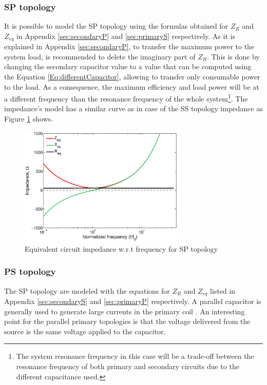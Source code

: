\subsubsection{SP topology}

It is possible to model the SP topology using the formulas obtained for $Z_R$ and $Z_{eq}$ in Appendix \ref{sec:secondaryP} and \ref{sec:primaryS} respectively. As it is explained in Appendix \ref{sec:secondaryP}, to transfer the maximum power to the system load, is recommended to delete the imaginary part of $Z_R$. This is done by changing the secondary capacitor value to a value that can be computed using the Equation \ref{Eq:differentCapacitor}, allowing to transfer only consumable power to the load. As a consequence, the maximum efficiency and load power will be at a different frequency than the resonance frequency of the whole system\footnote{The system resonance frequency in this case will be a trade-off between the resonance frequency of both primary and secondary circuits due to the different capacitance used.}. The impedance's model has a similar curve as in case of the SS topology impedance as Figure \ref{F:SPimpedance} shows.

\begin{figure}[h!]
\begin{center}
\includegraphics[width=0.7\textwidth]{./images/SP_impedance} 
\caption{Equivalent circuit impedance w.r.t frequency for SP topology}
\label{F:SPimpedance}
\end{center}
\end{figure}

\subsubsection{PS topology}

The SP topology are modeled with the equations for $Z_R$ and $Z_{eq}$ listed in Appendix \ref{sec:secondaryS} and \ref{sec:primaryP} respectively. A parallel capacitor is generally used to generate large currents in the primary coil \cite{meyer}. An interesting point for the parallel primary topologies is that the voltage delivered from the source is the same voltage applied to the capacitor.

